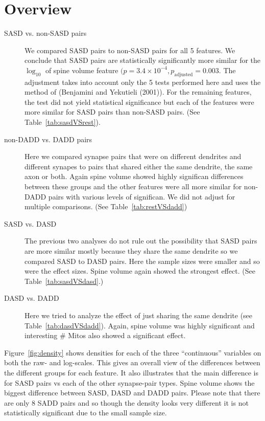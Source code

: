 \documentclass[12pt]{article}
\theoremstyle{definition}
\begin{document}
\section{Overview}
\begin{description}
\item[SASD vs. non-SASD pairs] We compared SASD pairs to non-SASD pairs for all 5 features. We conclude that SASD pairs are statistically significantly more similar for the $\log_{10}$ of spine volume feature $(p=3.4\times 10^{-4}, p_{\text{adjusted}} = 0.003$. The adjustment takes into account only the 5 tests performed here and uses the method of (Benjamini and Yekutieli (2001)). For the remaining features, the test did not yield statistical significance but each of the features were more similar for SASD pairs than non-SASD pairs. (See Table~\ref{tab:sasdVSrest}).
\item[non-DADD vs. DADD pairs] Here we compared synapse pairs that were on different dendrites and different synapes to pairs that shared either the same dendrite, the same axon or both. 
Again spine volume showed highly significan differences between these groups and the other features were all more similar for non-DADD pairs with various levels of significan.
We did not adjust for multiple comparisons. (See Table~\ref{tab:restVSdadd})
\item[SASD vs. DASD] The previous two analyses do not rule out the possibility that SASD pairs  are more similar mostly because they share the same dendrite so we compared SASD to DASD pairs. 
Here the sample sizes were smaller and so were the effect sizes. 
Spine volume again showed the strongest effect. (See Table~\ref{tab:sasdVSdasd}.)
\item[DASD vs. DADD] Here we tried to analyze the effect of just sharing the same dendrite (see Table~\ref{tab:dasdVSdadd}). Again, spine volume was highly significant and interesting \# Mitos also showed a significant effect.
\end{description}

Figure~\ref{fig:density} shows densities for each of the three ``continuous'' variables on both the raw- and log-scales. 
This gives an overall view of the differences between the different groups for each feature. It also illustrates that the main difference is for SASD pairs vs each of the other synapse-pair types. 
Spine volume shows the biggest difference between SASD, DASD and DADD pairs. 
Please note that there are only 8 SADD pairs and so though the density looks very different it is not statistically significant due to the small sample size.
\end{document}
